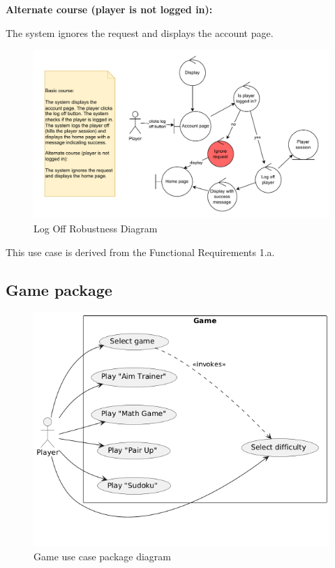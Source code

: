\documentclass[11pt,a4paper]{article}
\newcommand{\heading}[1]{\vspace{1em}\noindent\textbf{#1}\par\vspace{0.5em}}
\begin{document}
\heading{Alternate course (player is not logged in):}
The system ignores the request and displays the account page.

\begin{figure}[H]
    \centering
    \includegraphics[width=1\textwidth,keepaspectratio]{robustness/log_off.drawio.pdf}
    \caption{Log Off Robustness Diagram}
    \label{fig:log_off_robustness}
\end{figure}

This use case is derived from the Functional Requirements 1.a.

\subsection{Game package}

\begin{figure}[H]
    \centering
    \includegraphics[width=1\textwidth,keepaspectratio]{PSI_3rd_trial/use_case_game_selection.png}
    \caption{Game use case package diagram}
    \label{fig:game_package}
\end{figure}
\end{document}
